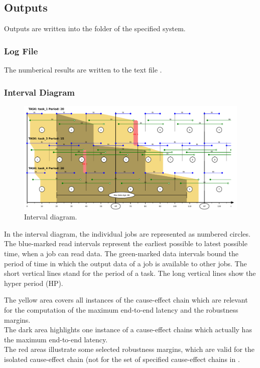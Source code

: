 \newpage
\subsection{Outputs}
\label{sec:outputs}
Outputs are written into the folder of the specified system.

\subsubsection{Log File}
The numberical results are written to the text file 
.

\subsubsection{Interval Diagram}
%
\begin{figure}
		\centering
		\includegraphics[width=415pt]{fig/intervalls.pdf}
		\caption{Interval diagram.}
		\label{fig:interval_diagram}
\end{figure}
%
In the interval diagram, the individual jobs are represented as numbered circles. 
The blue-marked read intervals represent the earliest possible to latest possible time, when a job can read data. 
The green-marked data intervals bound the period of time in which the output data of a job is available to other jobs.
The short vertical lines stand for the period of a task.
The long vertical lines show the hyper period (HP).
\smallskip

The yellow area covers all instances of the cause-effect chain which are relevant for the computation of the maximum end-to-end latency and the robustness margins. \\
The dark area highlights one instance of a cause-effect chains which actually has the maximum end-to-end latency. \\
The red areas illustrate some selected robustness margins, which are valid for the isolated cause-effect chain (not for the set of specified cause-effect chains in .


